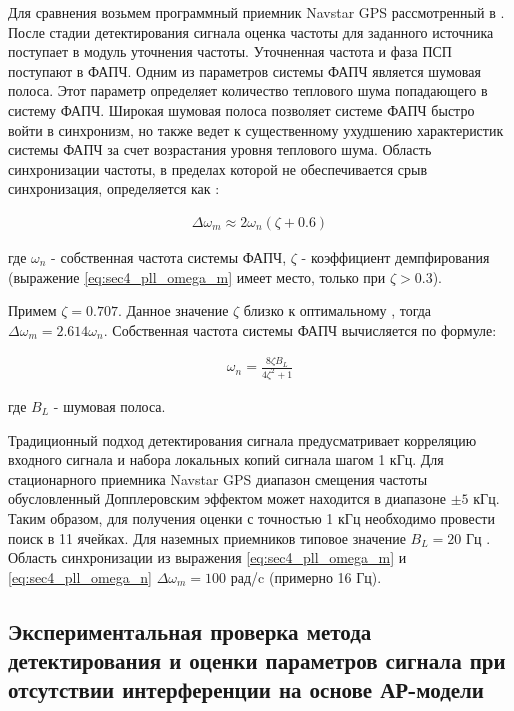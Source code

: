 Для сравнения возьмем программный приемник Navstar GPS рассмотренный в \cite{tsui, akos-book}. 
После стадии детектирования сигнала оценка частоты для заданного источника поступает в модуль уточнения частоты. Уточненная частота и фаза ПСП поступают в ФАПЧ.
Одним из параметров системы ФАПЧ является шумовая полоса. Этот параметр определяет количество теплового шума попадающего в систему ФАПЧ.
Широкая шумовая полоса позволяет системе ФАПЧ быстро войти в синхронизм, но также ведет к существенному ухудшению характеристик системы ФАПЧ за счет
возрастания уровня теплового шума.  Область синхронизации частоты, в пределах которой не обеспечивается срыв
синхронизация, определяется как \cite{spilker-book}:
\begin{center}
\begin{eqnarray}
	\label{eq:sec4_pll_omega_m}
	\Delta \omega_m \approx 2 \omega_n (\zeta + 0.6)
\end{eqnarray}
\end{center}
где ${\omega_n}$ - собственная частота системы ФАПЧ, ${\zeta}$ - коэффициент демпфирования (выражение \ref{eq:sec4_pll_omega_m} имеет место,
только при ${\zeta > 0.3}$).

Примем ${\zeta=0.707}$. Данное значение ${\zeta}$ близко к оптимальному \cite{tsui, spilker-book},
тогда ${\Delta \omega_m = 2.614 \omega_n}$. Собственная частота системы ФАПЧ вычисляется по формуле:
\begin{center}
\begin{eqnarray}
	\label{eq:sec4_pll_omega_n}
	\omega_n = \frac{8 \zeta B_L}{4 \zeta^2 + 1}
\end{eqnarray}
\end{center}
где ${B_L}$ - шумовая полоса.

Традиционный подход детектирования сигнала предусматривает корреляцию входного сигнала и набора локальных копий сигнала шагом 1 кГц.
Для стационарного приемника Navstar GPS диапазон смещения частоты обусловленный Допплеровским эффектом \cite{tsui} может находится в диапазоне ${\pm 5}$ кГц.
Таким образом, для получения оценки с точностью 1 кГц необходимо провести поиск в 11 ячейках. Для наземных приемников типовое значение 
${B_L=20}$ Гц \cite{tsui, akos-book}. Область синхронизации из выражения \ref{eq:sec4_pll_omega_m} и \ref{eq:sec4_pll_omega_n}
${\Delta \omega_m = 100}$ рад/c (примерно 16 Гц).
\subsection{Экспериментальная проверка метода детектирования и оценки параметров сигнала при отсутствии интерференции на основе АР-модели}

